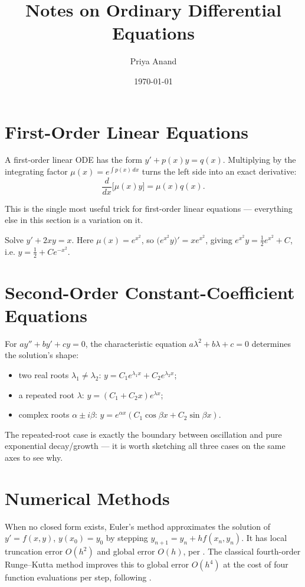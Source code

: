 \documentclass[en,blue,a4,10pt,bibtex]{elegantnote}
\title{Notes on Ordinary Differential Equations}
\author{Priya Anand}
\institute{Department of Applied Mathematics}
\date{\today}
\begin{document}
\maketitle

\section{First-Order Linear Equations}

A first-order linear ODE has the form $y' + p(x)y = q(x)$. Multiplying
by the integrating factor $\mu(x) = e^{\int p(x)\,dx}$ turns the left
side into an exact derivative:
\[
\frac{d}{dx}\big[\mu(x) y\big] = \mu(x) q(x).
\]

\begin{remark}
This is the single most useful trick for first-order linear equations
— everything else in this section is a variation on it.
\end{remark}

\begin{example}
Solve $y' + 2xy = x$. Here $\mu(x) = e^{x^2}$, so
$\big(e^{x^2} y\big)' = x e^{x^2}$, giving
$e^{x^2} y = \tfrac{1}{2} e^{x^2} + C$, i.e.
$y = \tfrac{1}{2} + C e^{-x^2}$.
\end{example}

\section{Second-Order Constant-Coefficient Equations}

For $ay'' + by' + cy = 0$, the characteristic equation
$a\lambda^2 + b\lambda + c = 0$ determines the solution's shape:

\begin{itemize}
  \item two real roots $\lambda_1 \neq \lambda_2$: $y = C_1 e^{\lambda_1 x} + C_2 e^{\lambda_2 x}$;
  \item a repeated root $\lambda$: $y = (C_1 + C_2 x) e^{\lambda x}$;
  \item complex roots $\alpha \pm i\beta$: $y = e^{\alpha x}(C_1 \cos \beta x + C_2 \sin \beta x)$.
\end{itemize}

\begin{note}
The repeated-root case is exactly the boundary between oscillation and
pure exponential decay/growth — it is worth sketching all three cases
on the same axes to see why.
\end{note}

\section{Numerical Methods}

When no closed form exists, Euler's method approximates the solution
of $y' = f(x, y)$, $y(x_0) = y_0$ by stepping
$y_{n+1} = y_n + h f(x_n, y_n)$. It has local truncation error
$O(h^2)$ and global error $O(h)$, per \textcite{butcher2016numerical}.
The classical fourth-order Runge--Kutta method improves this to global
error $O(h^4)$ at the cost of four function evaluations per step,
following \textcite{hairer1993solving}.

\printbibliography
\end{document}
